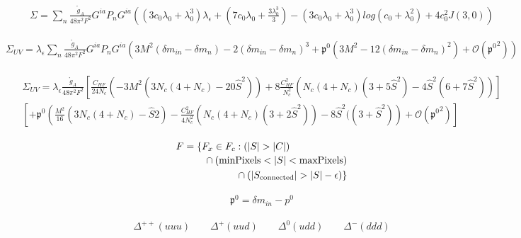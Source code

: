 \documentclass{article}
\newcommand{\bea}{\begin{eqnarray}}
\newcommand{\eea}{\end{eqnarray}}
\begin{document}
\bea
\Sigma= \sum_{n}^{} \frac{\mathring{g}_A}{48\pi^2F^2} G^{ia} P_n G^{ia} \left( (3c_0 \lambda_0 +\lambda_0^3)\lambda_\epsilon + \left( 7c_0\lambda_0 +\frac{3\lambda_0^3}{3}  \right) - (3c_0 \lambda_0 +\lambda_0^3) log(c_0+\lambda_0^2)+ 4c_0^2 J(3,0) \right)
\eea

\bea
\Sigma_{UV}= \lambda_\epsilon \sum_{n}^{} \frac{\mathring{g}_A}{48\pi^2F^2} G^{ia} P_n G^{ia} \left(   3M^2(\delta m_{in}-\delta m_n) -2(\delta m_{in}-\delta m_n)^3 + \mathfrak{p^0} \left(  3M^2-12(\delta m_{in}-\delta m_n)^2 \right) + \mathcal{O} \left( \mathfrak{p^0}^2 \right) \right)
\eea


\bea
\begin{multlined}
\Sigma_{UV}=  \lambda_\epsilon  \frac{\mathring{g}_A}{48\pi^2F^2} 
	 \left[   \frac{C_{HF}}{24N_c} 	\left(  -3M^2 (3N_c (4+N_c) -20 \hat{S}^2  )   \right) 
		+ 8 \frac{C_{HF}^2}{N_c^2} (N_c(4+N_c)(3+5 \hat{S}^2) -4 \hat{S}^2(6+7 \hat{S}^2) ) \right ] \\	
	\left[	+ \mathfrak{p^0} \left( \frac{M^2}{16} (3N_c (4+N_c)-\hat{S}2)
		- \frac{C_{HF}^2}{4N_c^2}(N_c(4+N_c)(3+2 \hat{S}^2))
		-8	\hat{S}^2 ((3+\hat{S}^2)  \right) + \mathcal{O} \left( \mathfrak{p^0}^2 \right)
	\right ]
\end{multlined}
\eea



\begin{equation}
\begin{multlined}
F = \{F_{x} \in  F_{c} : (|S| > |C|) \\
\shoveleft[1cm]{\cap (\mathrm{minPixels}  < |S| < \mathrm{maxPixels})} \\
\cap (|S_{\mathrm{connected}}| > |S| - \epsilon) \}
\end{multlined}
\end{equation}


\bea
 \mathfrak{p^0}=\delta m_{in}-p^0
\eea

\bea
\Delta^{++}\left( uuu \right) \qquad \Delta^{+}\left( uud \right) \qquad \Delta^{0}\left( udd \right) \qquad \Delta^{-}\left( ddd \right)
\eea

\newpage


 
%
\end{document}
